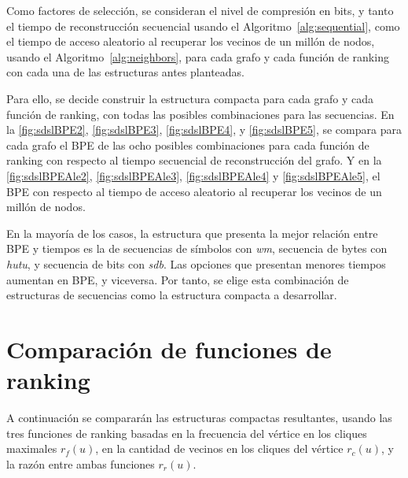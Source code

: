 Como factores de selección, se consideran el nivel de compresión en bits, y tanto el tiempo de reconstrucción secuencial usando el Algoritmo~\ref{alg:sequential}, como el tiempo de acceso aleatorio al recuperar los vecinos de un millón de nodos, usando el Algoritmo~\ref{alg:neighbors}, para cada grafo y cada función de ranking con cada una de las estructuras antes planteadas.


Para ello, se decide construir la estructura compacta para cada grafo y cada función de ranking, con todas las posibles combinaciones para las secuencias. En la \autoref{fig:sdslBPE2}, \autoref{fig:sdslBPE3}, \autoref{fig:sdslBPE4}, y \autoref{fig:sdslBPE5}, se compara para cada grafo el BPE de las ocho posibles combinaciones para cada función de ranking con respecto al tiempo secuencial de reconstrucción del grafo. Y en la \autoref{fig:sdslBPEAle2}, \autoref{fig:sdslBPEAle3}, \autoref{fig:sdslBPEAle4} y \autoref{fig:sdslBPEAle5}, el BPE con respecto al tiempo de acceso aleatorio al recuperar los vecinos de un millón de nodos.


En la mayoría de los casos, la estructura que presenta la mejor relación entre BPE y tiempos es la de secuencias de símbolos con \textit{wm}, secuencia de bytes con \textit{hutu}, y secuencia de bits con \textit{sdb}.  Las opciones que presentan menores tiempos aumentan en BPE, y viceversa. Por tanto, se elige esta combinación de estructuras de secuencias como la estructura compacta a desarrollar.











\section{Comparación de funciones de ranking}

A continuación se compararán las estructuras compactas resultantes, usando las tres funciones de ranking basadas en la frecuencia del vértice en los cliques maximales $r_{f}(u)$, en la cantidad de vecinos en los cliques del vértice $r_{c}(u)$, y la razón entre ambas funciones $r_{r}(u)$. 

